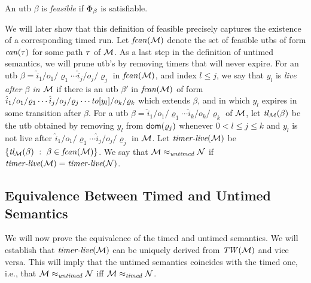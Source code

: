 \begin{definition}
  \label{def:feasible}
  An utb $\beta$ is \emph{feasible} if $\Phi_{\beta}$ is satisfiable.
\end{definition}
We will later show that this definition of feasible precisely captures
the existence of a corresponding timed run.
Let $\mathit{fcan}({{\mathcal M}})$ denote the set of feasible utbs of form $\mathit{can}({\tau})$ for some
path $\tau$ of ${\mathcal M}$.
As a last step in the definition of untimed semantics, we will
prune utb's by removing timers that will never expire.
For an utb
$\beta  =  {\hat{i}_1/o_1/\varrho_1}  \cdots {\hat{i}_j/o_j/\varrho_j}$ in $\mathit{fcan}({{\mathcal M}})$,
and index $l \leq j$,
we say that $y_l$ is \emph{live after $\beta$ in ${\mathcal M}$}
if there is an utb $\beta'$ in $\mathit{fcan}({{\mathcal M}})$ of form
${\hat{i}_1/o_1/\varrho_1}  \cdots {\hat{i}_j/o_j/\varrho_j} \cdots {\mathit{to}[y_l]/o_k/\varrho_k}$ which extends $\beta$, and in which 
$y_l$ expires in some transition after $\beta$.
For a utb $\beta  =  {\hat{i}_1/o_1/\varrho_1}  \cdots {\hat{i}_k/o_k/\varrho_k}$ of ${\mathcal M}$,
let $\mbox{\it tl}_{{\mathcal M}}({\beta})$ be the utb obtained by removing 
$y_l$ from ${\textsf{dom}}(\varrho_j)$ whenever $0 < l \leq j \leq k$ and
$y_l$ is not live after ${\hat{i}_1/o_1/\varrho_1}  \cdots {\hat{i}_j/o_j/\varrho_j}$ in ${\mathcal M}$.
Let
$\mbox{\it timer-live}({{\mathcal M}})$ be $\lbrace \mbox{\it tl}_{{\mathcal M}}({\beta}) ~:~ \beta \in \mathit{fcan}({{\mathcal M}})\rbrace$.
We say that ${\mathcal M} \approx_{\mathit{untimed}} {\mathcal N}$ if
$\mbox{\it timer-live}({{\mathcal M}}) = \mbox{\it timer-live}({{\mathcal N}})$.

\subsection{Equivalence Between Timed and Untimed Semantics}

We will now prove the equivalence of the timed and untimed semantics.
We will establish that $\mbox{\it timer-live}({{\mathcal M}})$ can
be uniquely derived from $\mathit{TW}({\mathcal M})$ and vice versa.
This will imply that the untimed semantics coincides with the timed
one, i.e., that
\(
{\mathcal M} \approx_{\mathit{untimed}} {\mathcal N}
\)
iff
\(
{\mathcal M} \approx_{\mathit{timed}} {\mathcal N}
\).


